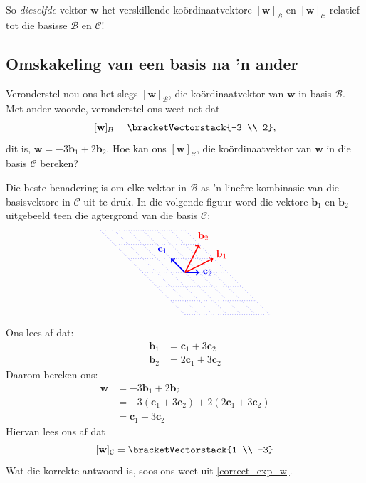 \documentclass[a4paper,11pt]{book}
\theoremstyle{definition}
\newcommand{\be}{\begin{equation}}
\newcommand{\ee}{\end{equation}}
\newcommand{\ve}[1]{\mathbf{#1}}
\newcommand{\basis}[1]{{\mathcal #1}}
\newcommand{\cvector}[1]{\bracketVectorstack{#1}}
\begin{document}
So \emph{dieselfde} vektor $\ve{w}$ het verskillende ko{\"o}rdinaatvektore
$[\ve{w}]_\basis{B}$ en $[\ve{w}]_\basis{C}$ relatief tot die basisse
$\basis{B}$ en $\basis{C}$!

\subsection{Omskakeling van een basis na 'n ander}

Veronderstel nou ons het slegs $[\ve{w}]_\basis{B}$, die
ko{\"o}rdinaatvektor van $\ve{w}$ in basis $\basis{B}$. Met ander woorde,
veronderstel ons weet net dat
\[
	[\ve{w}]_\basis{B} = \cvector{-3 \\ 2} , 
\]
dit is, $\ve{w} = -3 \ve{b}_1 + 2 \ve{b}_2$. Hoe kan ons
$[\ve{w}]_\basis{C}$, die ko{\"o}rdinaatvektor van $\ve{w}$ in die basis
$\basis{C}$ bereken?

Die beste benadering is om elke vektor in $\basis{B}$ as 'n line{\^e}re
kombinasie van die basisvektore in $\basis{C}$ uit te druk. In die volgende
figuur word die vektore $\ve{b}_1$ en $\ve{b}_2$ uitgebeeld teen die
agtergrond van die basis $\basis{C}$:
\[
	\begin{tikzpicture}[scale=0.5]
		\draw[blue, dotted] (-6, 3) -- (0, -3);
		\draw[blue, dotted] (-5, 3) -- (1, -3);
		\draw[blue, dotted] (-4, 3) -- (2, -3);
		\draw[blue, dotted] (-3, 3) -- (3, -3);
		\draw[blue, dotted] (-2, 3) -- (4, -3);
		\draw[blue, dotted] (-1, 3) -- (5, -3);
		\draw[blue, dotted] (-0, 3) -- (6, -3);

		\draw[blue, dotted] (-6, 3) -- (0, 3);
		\draw[blue, dotted] (-5, 2) -- (1, 2);
		\draw[blue, dotted] (-4, 1) -- (2, 1);
		\draw[blue, dotted] (-3, 0) -- (3, 0);
		\draw[blue, dotted] (-2, -1) -- (4, -1);
		\draw[blue, dotted] (-1, -2) -- (5, -2);
		\draw[blue, dotted] (0, -3) -- (6, -3);

		\draw[very thick, blue, ->] (0,0) -- node[pos=1.6] {$\ve{c}_2$}
		(1,0); 
		\draw[very thick, blue, ->] (0,0) -- node[pos=1.6] {$\ve{c}_1$}
		(-1,1);
		\draw[very thick, red, ->] (0,0) -- node[pos=1.3] {$\ve{b}_1$}
		(2,1); 
		\draw[very thick, red, ->] (0,0) -- node[pos=1.3] {$\ve{b}_2$}
		(1,2);

	\end{tikzpicture}
\]
Ons lees af dat:
\begin{align} \label{b_in_terms_of_c}
	\ve{b}_1 &= \ve{c}_1 + 3 \ve{c}_2 \\
	\ve{b}_2 &= 2 \ve{c}_1 + 3 \ve{c}_2 \label{b_in_terms_of_c_2} 
\end{align}
Daarom bereken ons: 
\begin{align*}
	\ve{w} &= -3 \ve{b}_1 + 2 \ve{b}_2 \\
	&= -3 (\ve{c}_1 + 3 \ve{c}_2) + 2(2 \ve{c}_1 + 3 \ve{c}_2) \\
	&= \ve{c}_1 - 3 \ve{c}_2
\end{align*}
Hiervan lees ons af dat
\be \label{w_in_basis_C}
	[\ve{w}]_\basis{C} = \cvector{1 \\ -3}
\ee
Wat die korrekte antwoord is, soos ons weet uit \eqref{correct_exp_w}. 
\end{document}
